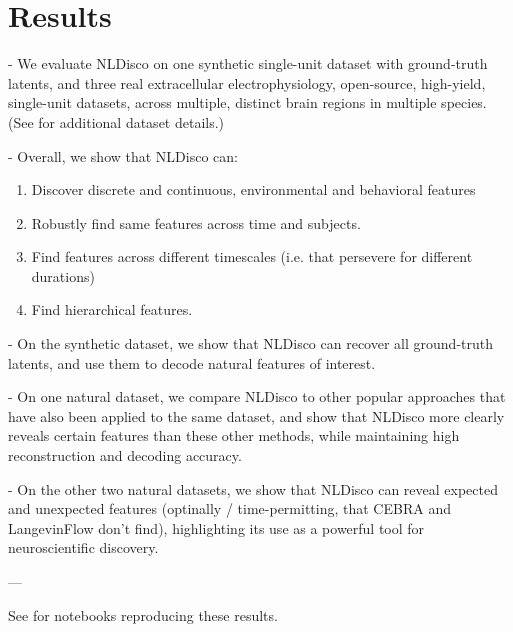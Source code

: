 \section{Results}
\label{section:results}

- We evaluate NLDisco on one synthetic single-unit dataset with ground-truth latents, and three real extracellular electrophysiology, open-source, high-yield, single-unit datasets, across multiple, distinct brain regions in multiple species. (See  for additional dataset details.)

- Overall, we show that NLDisco can:
\begin{enumerate}
    \item Discover discrete and continuous, environmental and behavioral features
    \item Robustly find same features across time and subjects.
    \item Find features across different timescales (i.e. that persevere for different durations)
    \item Find hierarchical features.
\end{enumerate}    

- On the synthetic dataset, we show that NLDisco can recover all ground-truth latents, and use them to decode natural features of interest.

- On one natural dataset, we compare NLDisco to other popular approaches that have also been applied to the same dataset, and show that NLDisco more clearly reveals certain features than these other methods, while maintaining high reconstruction and decoding accuracy.

- On the other two natural datasets, we show that NLDisco can reveal expected and unexpected features (optinally / time-permitting, that CEBRA and LangevinFlow don't find), highlighting its use as a powerful tool for neuroscientific discovery.

---








See  for notebooks reproducing these results.
